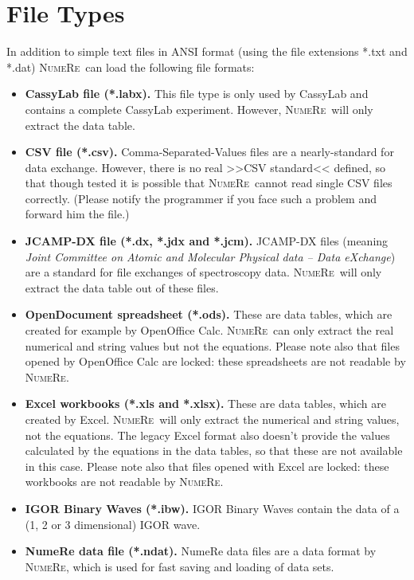 \documentclass[DIV=14,headsepline,footsepline]{scrbook}
\newcommand{\NR}{\textsc{Nu\-me\-Re}}
\begin{document}
			\section{File Types}
				In addition to simple text files in ANSI format (using the file extensions *.txt and *.dat) \NR\ can load the following file formats:
				\begin{itemize}
					\item \textbf{CassyLab file (*.labx).} This file type is only used by CassyLab and contains a complete CassyLab experiment. However, \NR\ will only extract the data table.
					\item \textbf{CSV file (*.csv).} Comma-Separated-Values files are a nearly-standard for data exchange. However, there is no real >>CSV standard<< defined, so that though tested it is possible that \NR\ cannot read single CSV files correctly. (Please notify the programmer if you face such a problem and forward him the file.)
					\item \textbf{JCAMP-DX file (*.dx, *.jdx and *.jcm).} JCAMP-DX files (meaning \emph{Joint Committee on Atomic and Molecular Physical data -- Data eXchange}) are a standard for file exchanges of spectroscopy data. \NR\ will only extract the data table out of these files.
					\item \textbf{OpenDocument spreadsheet (*.ods).} These are data tables, which are created for example by OpenOffice Calc. \NR\ can only extract the real numerical and string values but not the equations. Please note also that files opened by OpenOffice Calc are locked: these spreadsheets are not readable by \NR.
					\item \textbf{Excel workbooks (*.xls and *.xlsx).} These are data tables, which are created by Excel. \NR\ will only extract the numerical and string values, not the equations. The legacy Excel format also doesn't provide the values calculated by the equations in the data tables, so that these are not available in this case. Please note also that files opened with Excel are locked: these workbooks are not readable by \NR.
					\item \textbf{IGOR Binary Waves (*.ibw).} IGOR Binary Waves contain the data of a (1, 2 or 3 dimensional) IGOR wave.
					\item \textbf{NumeRe data file (*.ndat).} NumeRe data files are a data format by \NR, which is used for fast saving and loading of data sets.
				\end{itemize}
				
\end{document}
